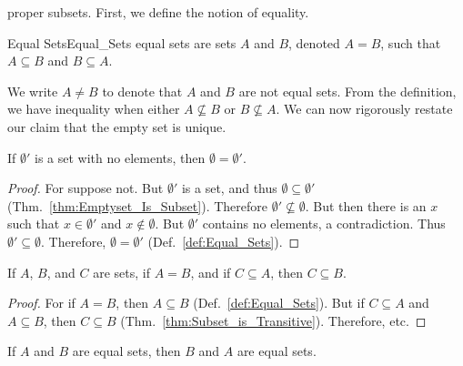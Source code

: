             proper subsets. First, we define the notion of
            equality.
            \begin{ldefinition}{Equal Sets}{Equal_Sets}
                \Glspl{equal set} are sets $A$ and $B$, denoted
                $A=B$, such that $A\subseteq{B}$ and
                $B\subseteq{A}$.
            \end{ldefinition}
            We write $A\ne{B}$ to denote that $A$ and $B$ are
            not equal sets. From the definition, we have
            inequality when either $A\nsubseteq{B}$ or
            $B\nsubseteq{A}$. 
            We can now rigorously restate our claim that the
            empty set is unique.
            \begin{theorem}
                If $\emptyset'$ is a set with no elements,
                then $\emptyset=\emptyset'$.
            \end{theorem}
            \begin{proof}
                For suppose not. But $\emptyset'$ is a set, and
                thus $\emptyset\subseteq\emptyset'$
                (Thm.~\ref{thm:Emptyset_Is_Subset}). Therefore
                $\emptyset'\nsubseteq\emptyset$. But then there
                is an $x$ such that $x\in\emptyset'$ and
                $x\notin\emptyset$. But $\emptyset'$ contains
                no elements, a contradiction. Thus
                $\emptyset'\subseteq\emptyset$. Therefore,
                $\emptyset=\emptyset'$
                (Def.~\ref{def:Equal_Sets}).
            \end{proof}
            \begin{theorem}
                \label{thm:Subsets_of_Equal_Sets}%
                If $A$, $B$, and $C$ are sets, if $A=B$, and if
                $C\subseteq{A}$, then $C\subseteq{B}$.
            \end{theorem}
            \begin{proof}
                For if $A=B$, then $A\subseteq{B}$
                (Def.~\ref{def:Equal_Sets}). But if
                $C\subseteq{A}$ and $A\subseteq{B}$, then
                $C\subseteq{B}$
                (Thm.~\ref{thm:Subset_is_Transitive}).
                Therefore, etc.
            \end{proof}
            \begin{theorem}
                \label{thm:Equality_Symmetric}%
                If $A$ and $B$ are equal sets, then $B$ and
                $A$ are equal sets.
            \end{theorem}
